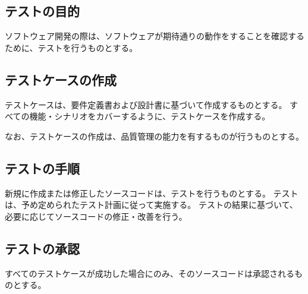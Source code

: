 \clearpage

\subsection{テストの目的}
ソフトウェア開発の際は、ソフトウェアが期待通りの動作をすることを確認するために、テストを行うものとする。

\subsection{テストケースの作成}
テストケースは、要件定義書および設計書に基づいて作成するものとする。
すべての機能・シナリオをカバーするように、テストケースを作成する。

なお、テストケースの作成は、品質管理の能力を有するものが行うものとする。

\subsection{テストの手順}
新規に作成または修正したソースコードは、テストを行うものとする。
テストは、予め定められたテスト計画に従って実施する。
テストの結果に基づいて、必要に応じてソースコードの修正・改善を行う。

\subsection{テストの承認}
すべてのテストケースが成功した場合にのみ、そのソースコードは承認されるものとする。

